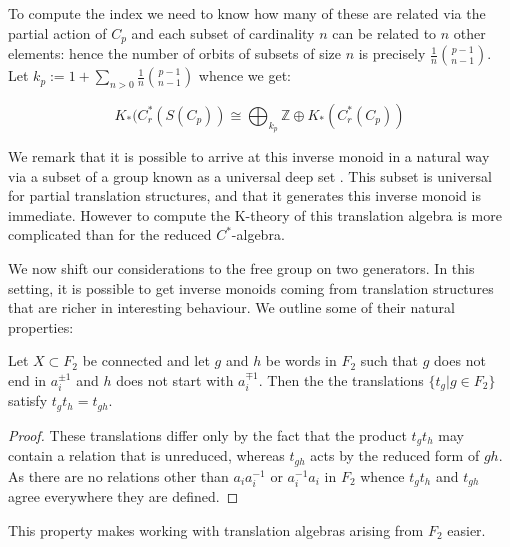 \begin{example}
To compute the index we need to know how many of these are related via the partial action of $C_{p}$ and each subset of cardinality $n$ can be related to $n$ other elements: hence the number of orbits of subsets of size $n$ is precisely $\frac{1}{n} {p-1 \choose n-1}$. Let $k_{p}:= 1+ \sum_{n>0}\frac{1}{n} {p-1 \choose n-1}$ whence we get:

\begin{equation*}
K_{*}(C^{*}_{r}(S(C_{p})) \cong \bigoplus_{k_{p}}\mathbb{Z} \oplus K_{*}(C^{*}_{r}(C_{p}))
\end{equation*}

We remark that it is possible to arrive at this inverse monoid in a natural way via a subset of a group known as a universal deep set \cite{BNW-KTA}. This subset is universal for partial translation structures, and that it generates this inverse monoid is immediate. However to compute the K-theory of this translation algebra is more complicated than for the reduced $C^{*}$-algebra.

\end{example}

We now shift our considerations to the free group on two generators. In this setting, it is possible to get inverse monoids coming from translation structures that are richer in interesting behaviour. We outline some of their natural properties:

\begin{claim}
Let $X \subset F_{2}$ be connected and let $g$ and $h$ be words in $F_{2}$ such that $g$ does not end in $a_{i}^{\pm 1}$ and $h$ does not start with $a_{i}^{\mp 1}$. Then the the translations $\lbrace t_{g} | g \in F_{2} \rbrace$ satisfy $t_{g}t_{h}=t_{gh}$. 
\end{claim}
\begin{proof}
These translations differ only by the fact that the product $t_{g}t_{h}$ may contain a relation that is unreduced, whereas $t_{gh}$ acts by the reduced form of $gh$. As there are no relations other than $a_{i}a_{i}^{-1}$ or $a_{i}^{-1}a_{i}$ in $F_{2}$ whence $t_{g}t_{h}$ and $t_{gh}$ agree everywhere they are defined.
\end{proof}

This property makes working with translation algebras arising from $F_{2}$ easier.

